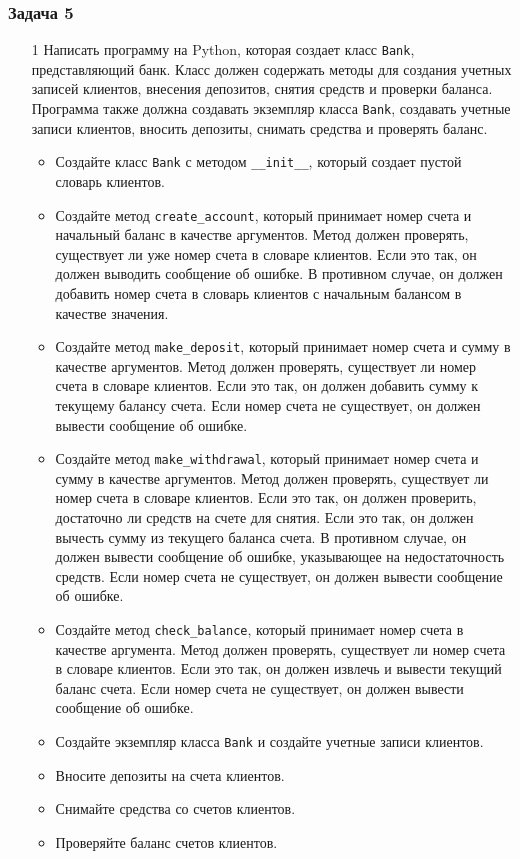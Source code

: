 \subsubsection{Задача 5}

\begin{enumerate}
\item[1] Написать программу на Python, которая создает класс \texttt{Bank}, представляющий банк. Класс должен содержать методы для создания учетных записей клиентов, внесения депозитов, снятия средств и проверки баланса. Программа также должна создавать экземпляр класса \texttt{Bank}, создавать учетные записи клиентов, вносить депозиты, снимать средства и проверять баланс.

\begin{itemize}
    \item Создайте класс \texttt{Bank} с методом \texttt{\_\_init\_\_}, который создает пустой словарь клиентов.
    \item Создайте метод \texttt{create\_account}, который принимает номер счета и начальный баланс в качестве аргументов. Метод должен проверять, существует ли уже номер счета в словаре клиентов. Если это так, он должен выводить сообщение об ошибке. В противном случае, он должен добавить номер счета в словарь клиентов с начальным балансом в качестве значения.
    \item Создайте метод \texttt{make\_deposit}, который принимает номер счета и сумму в качестве аргументов. Метод должен проверять, существует ли номер счета в словаре клиентов. Если это так, он должен добавить сумму к текущему балансу счета. Если номер счета не существует, он должен вывести сообщение об ошибке.
    \item Создайте метод \texttt{make\_withdrawal}, который принимает номер счета и сумму в качестве аргументов. Метод должен проверять, существует ли номер счета в словаре клиентов. Если это так, он должен проверить, достаточно ли средств на счете для снятия. Если это так, он должен вычесть сумму из текущего баланса счета. В противном случае, он должен вывести сообщение об ошибке, указывающее на недостаточность средств. Если номер счета не существует, он должен вывести сообщение об ошибке.
    \item Создайте метод \texttt{check\_balance}, который принимает номер счета в качестве аргумента. Метод должен проверять, существует ли номер счета в словаре клиентов. Если это так, он должен извлечь и вывести текущий баланс счета. Если номер счета не существует, он должен вывести сообщение об ошибке.
    \item Создайте экземпляр класса \texttt{Bank} и создайте учетные записи клиентов.
    \item Вносите депозиты на счета клиентов.
    \item Снимайте средства со счетов клиентов.
    \item Проверяйте баланс счетов клиентов.
\end{itemize}


\end{enumerate}
